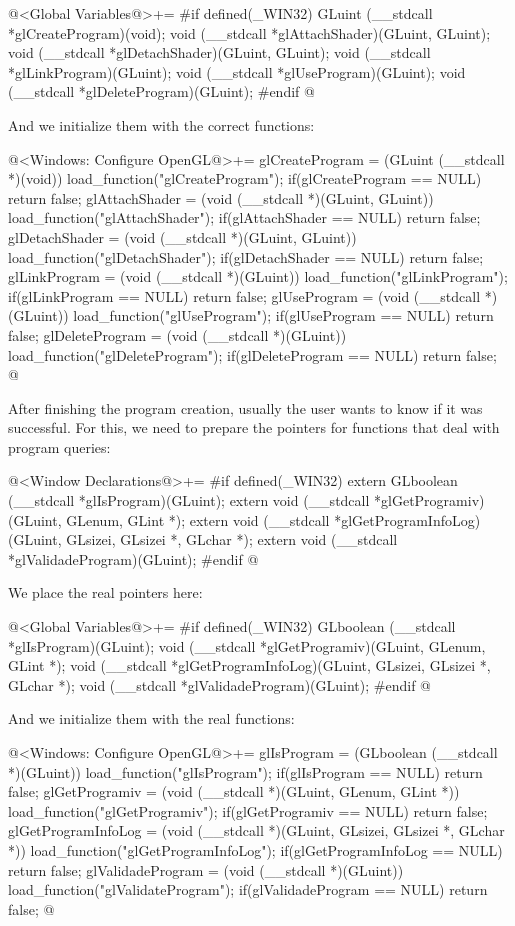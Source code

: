 \iniciocodigo
@<Global Variables@>+=
#if defined(_WIN32)
GLuint (__stdcall *glCreateProgram)(void);
void (__stdcall *glAttachShader)(GLuint, GLuint);
void (__stdcall *glDetachShader)(GLuint, GLuint);
void (__stdcall *glLinkProgram)(GLuint);
void (__stdcall *glUseProgram)(GLuint);
void (__stdcall *glDeleteProgram)(GLuint);
#endif
@
\fimcodigo

And we initialize them with the correct functions:

\iniciocodigo
@<Windows: Configure OpenGL@>+=
glCreateProgram = (GLuint (__stdcall *)(void)) load_function("glCreateProgram");
if(glCreateProgram == NULL) return false;
glAttachShader = (void (__stdcall *)(GLuint, GLuint))
                  load_function("glAttachShader");
if(glAttachShader == NULL) return false;
glDetachShader = (void (__stdcall *)(GLuint, GLuint))
                 load_function("glDetachShader");
if(glDetachShader == NULL) return false;
glLinkProgram = (void (__stdcall *)(GLuint)) load_function("glLinkProgram");
if(glLinkProgram == NULL) return false;
glUseProgram = (void (__stdcall *)(GLuint)) load_function("glUseProgram");
if(glUseProgram == NULL) return false;
glDeleteProgram = (void (__stdcall *)(GLuint)) load_function("glDeleteProgram");
if(glDeleteProgram == NULL) return false;
@
\fimcodigo

After finishing the program creation, usually the user wants to know
if it was successful.  For this, we need to prepare the pointers for
functions that deal with program queries:

\iniciocodigo
@<Window Declarations@>+=
#if defined(_WIN32)
extern GLboolean (__stdcall *glIsProgram)(GLuint);
extern void (__stdcall *glGetProgramiv)(GLuint, GLenum, GLint *);
extern void (__stdcall *glGetProgramInfoLog)(GLuint, GLsizei, GLsizei *,
                                             GLchar *);
extern void (__stdcall *glValidadeProgram)(GLuint);
#endif
@
\fimcodigo

We place the real pointers here:

\iniciocodigo
@<Global Variables@>+=
#if defined(_WIN32)
GLboolean (__stdcall *glIsProgram)(GLuint);
void (__stdcall *glGetProgramiv)(GLuint, GLenum, GLint *);
void (__stdcall *glGetProgramInfoLog)(GLuint, GLsizei, GLsizei *, GLchar *);
void (__stdcall *glValidadeProgram)(GLuint);
#endif
@
\fimcodigo

And we initialize them with the real functions:

\iniciocodigo
@<Windows: Configure OpenGL@>+=
glIsProgram = (GLboolean (__stdcall *)(GLuint)) load_function("glIsProgram");
if(glIsProgram == NULL) return false;
glGetProgramiv = (void (__stdcall *)(GLuint, GLenum, GLint *))
                    load_function("glGetProgramiv");
if(glGetProgramiv == NULL) return false;
glGetProgramInfoLog = (void (__stdcall *)(GLuint, GLsizei, GLsizei *, GLchar *))
                          load_function("glGetProgramInfoLog");
if(glGetProgramInfoLog == NULL) return false;
glValidadeProgram = (void (__stdcall *)(GLuint))
                     load_function("glValidateProgram");
if(glValidadeProgram == NULL) return false;
@
\fimcodigo

